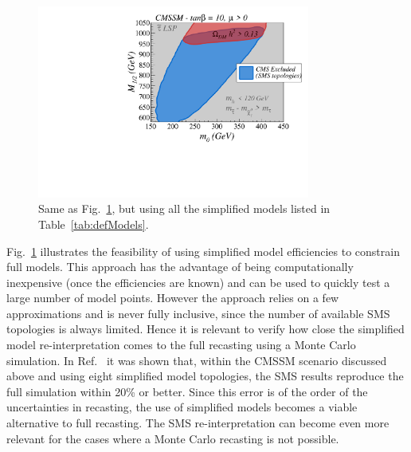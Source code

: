 \begin{figure}[!h]
\centering
\includegraphics[width=0.8\textwidth]{ch5-figures/sms_exclusion_all.pdf}
\caption{Same as Fig.~\ref{fig:cmssmB}, but using all the simplified
models listed in Table~\ref{tab:defModels}.
}
\label{fig:cmssmB}
\end{figure}


Fig.~\ref{fig:cmssmB} illustrates the feasibility of using simplified
model efficiencies to constrain full models.
This approach has the advantage of being computationally inexpensive
(once the efficiencies are known) and can be used to quickly test
a large number of model points. However the approach relies on a few
approximations and is never fully inclusive, since the number of available SMS topologies is always limited.
Hence it is relevant to verify
how close the simplified model re-interpretation comes to the full recasting
using a Monte Carlo simulation.
In Ref.~\cite{Heisig:2015yla} it was shown that, within
the CMSSM scenario discussed above and using eight simplified model
topologies, the SMS results reproduce the full simulation within
20\% or better.
Since this error is of the order of the uncertainties in recasting,
the use of simplified models becomes a viable alternative to full recasting.
The SMS re-interpretation can become even more relevant for the cases
where a Monte Carlo recasting is not possible.


\vskip 0.1in
\vskip 0.1in




